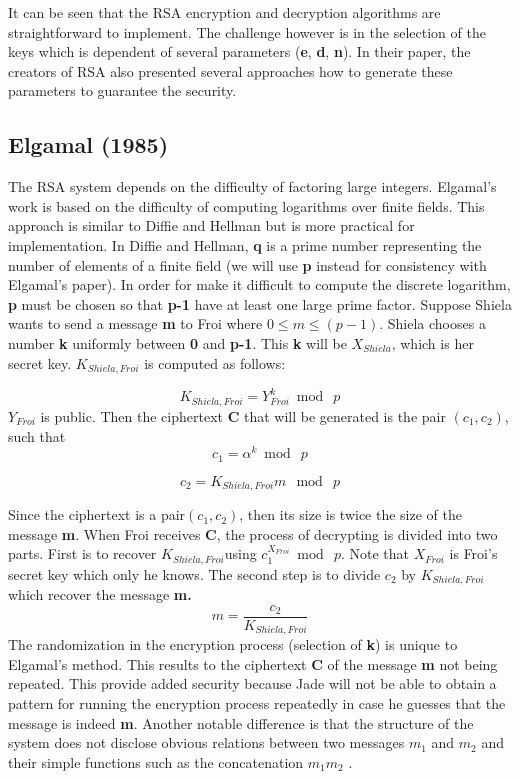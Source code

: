 \documentclass{article}
\begin{document}
It can be seen that the RSA encryption and decryption algorithms are
straightforward to implement. The challenge however is in the selection
of the keys which is dependent of several parameters (\textbf{e},
\textbf{d}, \textbf{n}). In their paper, the creators of RSA also
presented several approaches how to generate these parameters to guarantee
the security.


\subsection{Elgamal (1985)}

The RSA\cite{rivest_method_1978} system depends on the difficulty
of factoring large integers. Elgamal's work is based on the difficulty
of computing logarithms over finite fields\cite{elgamal_public_1985}.
This approach is similar to Diffie and Hellman but is more practical
for implementation. In Diffie and Hellman, \textbf{q} is a prime number
representing the number of elements of a finite field (we will use
\textbf{p} instead for consistency with Elgamal's paper). In order
for make it difficult to compute the discrete logarithm, \textbf{p}
must be chosen so that \textbf{p-1} have at least one large prime
factor. Suppose Shiela wants to send a message \textbf{m} to Froi
where $0\leq m\leq(p-1)$. Shiela chooses a number \textbf{k} uniformly
between \textbf{0} and \textbf{p-1}. This \textbf{k} will be $X_{Shiela}$,
which is her secret key. $K_{Shiela,Froi}$ is computed as follows:

\[
K_{Shiela,Froi}=Y_{Froi}^{k}\bmod\: p
\]
 $Y_{Froi}$ is public. Then the ciphertext \textbf{C} that will be
generated is the pair $(c_{1},c_{2})$, such that
\[
c_{1}=\alpha^{k}\bmod\: p
\]


\[
c_{2}=K_{Shiela,Froi}m\: \bmod\: p
\]


Since the ciphertext is a pair$(c_{1},c_{2})$, then its size is twice
the size of the message \textbf{m}. When Froi receives \textbf{C},
the process of decrypting is divided into two parts. First is to recover
$K_{Shiela,Froi}$using $c_{1}^{X_{Froi}}\bmod\: p$. Note that $X_{Froi}$
is Froi's secret key which only he knows. The second step is to divide
$c_{2}$ by $K_{Shiela,Froi}$ which recover the message \textbf{m.
\[
m=\frac{c_{2}}{K_{Shiela,Froi}}
\]
 }The randomization in the encryption process (selection of \textbf{k})
is unique to Elgamal's method. This results to the ciphertext \textbf{C}
of the message \textbf{m} not being repeated. This provide added security
because Jade will not be able to obtain a pattern for running the
encryption process repeatedly in case he guesses that the message
is indeed \textbf{m}. Another notable difference is that the structure
of the system does not disclose obvious relations between two messages
$m_{1}$ and $m_{2}$ and their simple functions such as the concatenation
$m_{1}m_{2}$\cite{elgamal_public_1985} .
\end{document}
